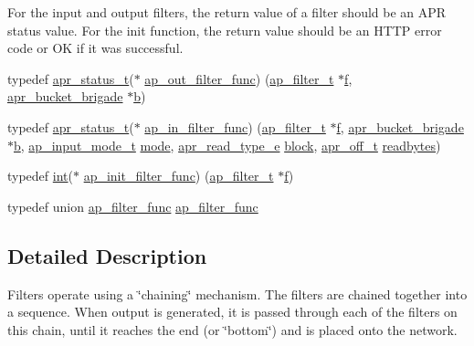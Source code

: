 For the input and output filters, the return value of a filter should be an A\+PR status value. For the init function, the return value should be an H\+T\+TP error code or OK if it was successful. \begin{DoxyCompactItemize}
\item 
typedef \hyperlink{group__apr__errno_gaa5105fa83cc322f09382292db8b47593}{apr\+\_\+status\+\_\+t}($\ast$ \hyperlink{group__APACHE__CORE__FILTER_ga5c80541a5a1dcc9a383e90aa82be59b3}{ap\+\_\+out\+\_\+filter\+\_\+func}) (\hyperlink{structap__filter__t}{ap\+\_\+filter\+\_\+t} $\ast$\hyperlink{pcregrep_8txt_a588c778c1c1509e472f22dc36efb005e}{f}, \hyperlink{structapr__bucket__brigade}{apr\+\_\+bucket\+\_\+brigade} $\ast$\hyperlink{group__APR__Util__Bucket__Brigades_ga11dc1bdeac74315dbed17465c98879e9}{b})
\item 
typedef \hyperlink{group__apr__errno_gaa5105fa83cc322f09382292db8b47593}{apr\+\_\+status\+\_\+t}($\ast$ \hyperlink{group__APACHE__CORE__FILTER_ga8e6e76deedf9ef3e3a4aa33419663875}{ap\+\_\+in\+\_\+filter\+\_\+func}) (\hyperlink{structap__filter__t}{ap\+\_\+filter\+\_\+t} $\ast$\hyperlink{pcregrep_8txt_a588c778c1c1509e472f22dc36efb005e}{f}, \hyperlink{structapr__bucket__brigade}{apr\+\_\+bucket\+\_\+brigade} $\ast$\hyperlink{group__APR__Util__Bucket__Brigades_ga11dc1bdeac74315dbed17465c98879e9}{b}, \hyperlink{util__filter_8h_ab570898d09fbbe5b6d838e28b90134e0}{ap\+\_\+input\+\_\+mode\+\_\+t} \hyperlink{pcregrep_8txt_ad194431669b7d1f96d2dacfb7be21261}{mode}, \hyperlink{group__APR__Util__Bucket__Brigades_ga756973fb6392bd1026c3d96b4519776d}{apr\+\_\+read\+\_\+type\+\_\+e} \hyperlink{pcretest_8txt_aebde0006968e3c574305c604c927277a}{block}, \hyperlink{group__apr__platform_ga6938af9075cec15c88299109381aa984}{apr\+\_\+off\+\_\+t} \hyperlink{group__APACHE__CORE__FILTER_ga0ce3dc88443223a04b0d1a3167356aee}{readbytes})
\item 
typedef \hyperlink{pcre_8txt_a42dfa4ff673c82d8efe7144098fbc198}{int}($\ast$ \hyperlink{group__APACHE__CORE__FILTER_ga7ecd47b41aacab276198f6d1fc05a56c}{ap\+\_\+init\+\_\+filter\+\_\+func}) (\hyperlink{structap__filter__t}{ap\+\_\+filter\+\_\+t} $\ast$\hyperlink{pcregrep_8txt_a588c778c1c1509e472f22dc36efb005e}{f})
\item 
typedef union \hyperlink{unionap__filter__func}{ap\+\_\+filter\+\_\+func} \hyperlink{group__APACHE__CORE__FILTER_gae311727bef0a44e37d84a7c85ff67818}{ap\+\_\+filter\+\_\+func}
\end{DoxyCompactItemize}


\subsection{Detailed Description}
Filters operate using a \char`\"{}chaining\char`\"{} mechanism. The filters are chained together into a sequence. When output is generated, it is passed through each of the filters on this chain, until it reaches the end (or \char`\"{}bottom\char`\"{}) and is placed onto the network.

